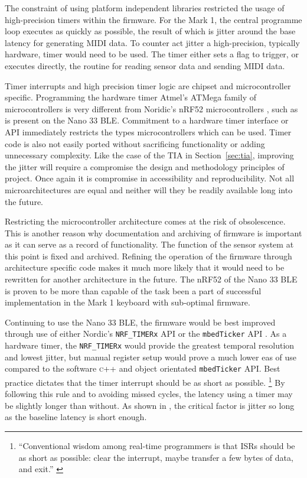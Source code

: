 The constraint of using platform independent libraries restricted the usage of
high-precision timers within the firmware. For the Mark 1, the central programme
loop executes as quickly as possible, the result of which is jitter around the
base latency for generating MIDI data. To counter act jitter a high-precision,
typically hardware, timer would need to be used. The timer either sets a flag to
trigger, or executes directly, the routine for reading sensor data and sending
MIDI data.

Timer interrupts and high precision timer logic are chipset and microcontroller
specific. Programming the hardware timer Atmel's ATMega family of
microcontrollers \cite{gammon_interrupts_2012} is very different from Noridic's
nRF52 microcontrollers \cite{wolff_realtime_2019}, such as is present on the
Nano 33 BLE. Commitment to a hardware timer interface or API immediately
restricts the types microcontrollers which can be used. Timer code is also not
easily ported without sacrificing functionality or adding unnecessary
complexity. Like the case of the TIA in Section~\ref{sec:tia}, improving the
jitter will require a compromise the design and methodology principles of
project. Once again it is compromise in accessibility and reproducibility. Not
all microarchitectures are equal and neither will they be readily available long
into the future.

Restricting the microcontroller architecture comes at the risk of obsolescence.
This is another reason why documentation and archiving of firmware is important
as it can serve as a record of functionality. The function of the sensor system
at this point is fixed and archived. Refining the operation of the firmware
through architecture specific code makes it much more likely that it would need
to be rewritten for another architecture in the future. The nRF52 of the Nano 33
BLE is proven to be more than capable of the task been a part of successful
implementation in the Mark 1 keyboard with sub-optimal firmware.

Continuing to use the Nano 33 BLE, the firmware would be best improved through
use of either Nordic's \texttt{NRF\_TIMERx} API \cite{nordic_timer_2023,
    nordic_timer_2025} or the \texttt{mbed\:\:Ticker} API \cite{mbed_ticker_2023}.
As a hardware timer, the \texttt{NRF\_TIMERx}  would provide the greatest
temporal resolution and lowest jitter, but manual register setup would prove a
much lower eas of use compared to the software \textsc{c++} and object
orientated \texttt{mbed\:\:Ticker} API. Best practice dictates that the timer
interrupt should be as short as possible.%
\footnote{``Conventional wisdom among real-time programmers is that ISRs should
    be as short as possible: clear the interrupt, maybe transfer a few bytes of
    data, and exit.'' \cite{klingensmith_using_2019}} By following this rule and
to avoiding missed cycles, the latency using a timer may be slightly longer
than without. As shown in \textcite{jack_effect_2016}, the critical factor
is jitter so long as the baseline latency is short enough.

